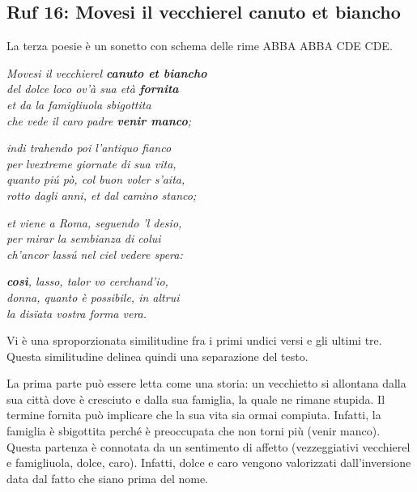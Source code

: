 \documentclass[a4paper]{article}
\begin{document}
\pagebreak

\subsection{Ruf 16: Movesi il vecchierel canuto et biancho}

La terza poesie è un sonetto con schema delle rime ABBA ABBA CDE CDE.

\begin{center}
    \textit{Movesi il vecchierel \textbf{canuto et biancho}} \\
    \textit{del dolce loco ov'à sua età \textbf{fornita}} \\
    \textit{et da la famigliuola sbigottita} \\
    \textit{che vede il caro padre \textbf{venir manco};}
\end{center}
\begin{center}
    \textit{indi trahendo poi l'antiquo fianco} \\
    \textit{per lvextreme giornate di sua vita,} \\
    \textit{quanto piú pò, col buon voler s'aita,} \\
    \textit{rotto dagli anni, et dal camino stanco;}
\end{center}
\begin{center}
    \textit{et viene a Roma, seguendo 'l desio,} \\
    \textit{per mirar la sembianza di colui} \\
    \textit{ch'ancor lassú nel ciel vedere spera:}
\end{center}
\begin{center}
    \textit{\textbf{così}, lasso, talor vo cerchand'io,} \\
    \textit{donna, quanto è possibile, in altrui} \\
    \textit{la disïata vostra forma vera.}
\end{center}

Vi è una sproporzionata similitudine fra i primi undici versi e gli ultimi tre.
Questa similitudine delinea quindi una separazione del testo.

La prima parte può essere letta come una storia: un vecchietto si allontana
dalla sua città dove è cresciuto e dalla sua famiglia, la quale ne rimane stupida.
Il termine fornita può implicare che la sua vita sia ormai compiuta.
Infatti, la famiglia è sbigottita perché è preoccupata che non torni più (venir manco).
Questa partenza è connotata da un sentimento di affetto (vezzeggiativi vecchierel e famigliuola, dolce, caro).
Infatti, dolce e caro vengono valorizzati dall'inversione data dal fatto che siano prima del nome.
\end{document}
